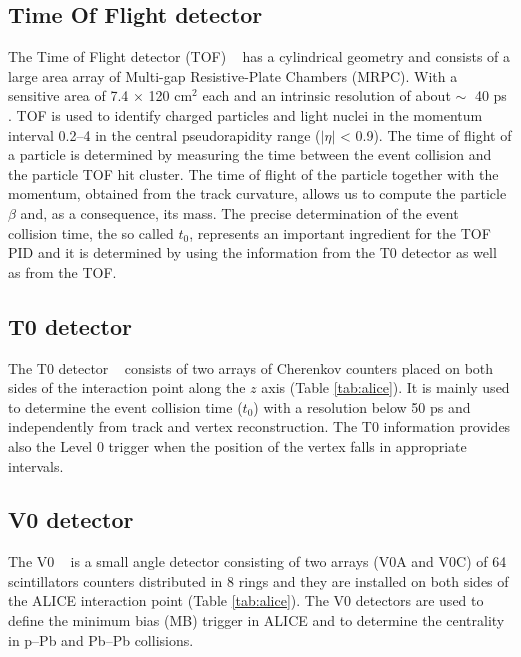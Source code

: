 %
\subsection{Time Of Flight detector} \label{sec:tof}

The Time of Flight detector (TOF) ~\cite{alice_tof} has a cylindrical geometry and consists of a large area array of 
Multi-gap Resistive-Plate Chambers (MRPC).
With a sensitive area of 7.4 × 120 cm$^2$ each and an intrinsic resolution of about $\sim\;$ 40 ps 
\cite{alicemulti}. TOF is used to identify charged particles and light nuclei in the momentum interval 
0.2--4 \gevc in the central pseudorapidity range ($|\eta|$ < 0.9).
The time of flight of a particle is determined by measuring the time between the event collision and the
particle TOF hit cluster. 
The time of flight of the particle together with the momentum, obtained from the track curvature, 
allows us to compute the particle $\beta$ and, as a consequence, its mass.
The precise determination of the event collision time, the so called $t_{0}$, represents an important
ingredient for the TOF PID and it is determined by using the information from the T0 detector as 
well as from the TOF. 

%
\subsection{T0 detector} \label{sec:t0}

The T0 detector ~\cite{alice_t0} consists of two arrays of Cherenkov counters placed on both 
sides of the interaction point along the $z$ axis (Table \ref{tab:alice}).
It is mainly used to determine the event collision time ($t_{0}$) with a resolution below 50 ps
and  independently from track and vertex reconstruction. 
The T0 information provides also the Level 0 trigger when the position of the vertex falls in
appropriate intervals.

%
\subsection{V0 detector} \label{sec:v0}

The V0 ~\cite{alice_v0} is a small angle detector consisting of two arrays (V0A and V0C) of 64 
scintillators counters distributed in 8 rings and they are installed on both sides of the ALICE
interaction point (Table \ref{tab:alice}). 
The V0 detectors are used to define the minimum bias (MB) trigger in ALICE and to determine the
centrality in p–Pb and Pb–Pb collisions.

